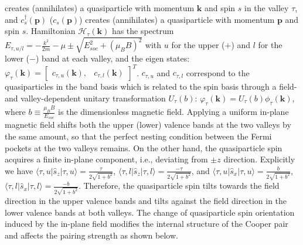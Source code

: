 creates (annihilates) a quasiparticle with momentum $\mathbf{k}$
and spin $s$ in the valley $\tau$, and $c_{s}^{\dagger}(\mathbf{p})$
($c_{s}(\mathbf{p})$) creates (annihilates) a quasiparticle with
momentum $\mathbf{p}$ and spin $s$. Hamiltonian $\mathcal{H}_{\tau}(\mathbf{k})$
has the spectrum $E_{\tau,u/l}=-\frac{k^{2}}{2m}-\mu\pm\sqrt{E_{soc}^{2}+\left(\mu_{B}B\right)^{2}}$
with $u$ for the upper ($+$) and $l$ for the lower ($-$) band
at each valley, and the eigen states: $\varphi_{\tau}(\mathbf{k})=\left[\begin{array}{cc}
c_{\tau,u}(\mathbf{k}), & c_{\tau,l}(\mathbf{k})\end{array}\right]^{T}$. $c_{\tau,u}$ and $c_{\tau,l}$ correspond to the quasiparticles
in the band basis which is related to the spin basis through a field-
and valley-dependent unitary transformation $U_{\tau}(b)$: $\varphi_{\tau}(\mathbf{k})=U_{\tau}(b)\phi_{\tau}(\mathbf{k})$,
where $b\equiv\frac{\mu_{B}B}{E_{soc}}$ is the dimensionless magnetic
field. Applying a uniform in-plane magnetic field shifts both the
upper (lower) valence bands at the two valleys
by the same amount, so that the perfect nesting condition between
the Fermi pockets at the two valleys remains. On the other hand, the
quasiparticle spin acquires a finite in-plane component, i.e., deviating
from $\pm z$ direction. Explicitly we have $\langle\tau,u\left|\hat{s}_{z}\right|\tau,u\rangle=\frac{\tau}{2\sqrt{1+b^{2}}}$,
$\langle\tau,l\left|\hat{s}_{z}\right|\tau,l\rangle=\frac{-\tau}{2\sqrt{1+b^{2}}}$,
and $\langle\tau,u\left|\hat{s}_{x}\right|\tau,u\rangle=\frac{b}{2\sqrt{1+b^{2}}}$,
$\langle\tau,l\left|\hat{s}_{x}\right|\tau,l\rangle=\frac{-b}{2\sqrt{1+b^{2}}}$.
Therefore, the quasiparticle spin tilts towards the field direction
in the upper valence bands and tilts against the field direction in
the lower valence bands at both valleys. The change of quasiparticle
spin orientation induced by the in-plane field modifies the internal
structure of the Cooper pair and affects the pairing strength as shown
below.

